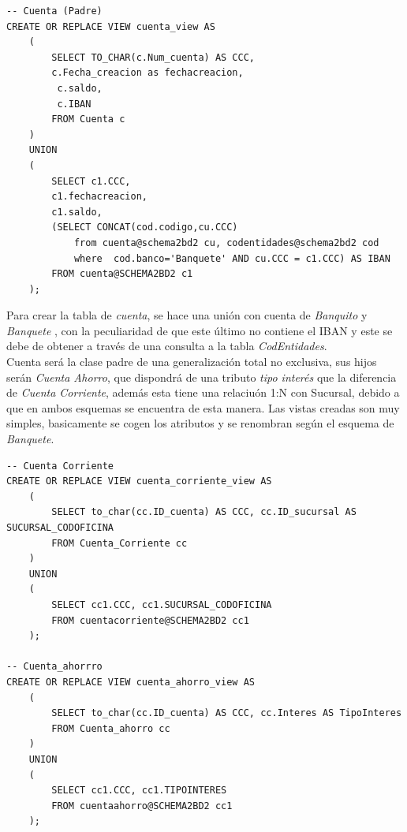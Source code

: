 \documentclass{article}
\begin{document}
\begin{lstlisting}
-- Cuenta (Padre)
CREATE OR REPLACE VIEW cuenta_view AS
    (
        SELECT TO_CHAR(c.Num_cuenta) AS CCC,
        c.Fecha_creacion as fechacreacion,
         c.saldo, 
         c.IBAN
        FROM Cuenta c
    )
    UNION
    (
        SELECT c1.CCC, 
        c1.fechacreacion, 
        c1.saldo, 
        (SELECT CONCAT(cod.codigo,cu.CCC) 
            from cuenta@schema2bd2 cu, codentidades@schema2bd2 cod
            where  cod.banco='Banquete' AND cu.CCC = c1.CCC) AS IBAN
        FROM cuenta@SCHEMA2BD2 c1
    );
\end{lstlisting}
Para crear la tabla de \textit{cuenta}, se hace una unión con cuenta de \emph{Banquito} y \emph{Banquete }, con la peculiaridad de que este último no contiene el IBAN y este se debe de obtener a través de una consulta a la tabla \textit{CodEntidades}.\\
Cuenta será la clase padre de una generalización total no exclusiva, sus hijos serán \textit{Cuenta Ahorro}, que dispondrá de una tributo \textit{tipo interés }que la diferencia de \textit{Cuenta Corriente}, además esta tiene una relaciuón 1:N con Sucursal, debido a que en ambos esquemas se encuentra de esta manera. Las vistas creadas son muy simples, basicamente se cogen los atributos y se renombran según el esquema de \emph{Banquete}.
\begin{lstlisting}
-- Cuenta Corriente
CREATE OR REPLACE VIEW cuenta_corriente_view AS
    (
        SELECT to_char(cc.ID_cuenta) AS CCC, cc.ID_sucursal AS SUCURSAL_CODOFICINA
        FROM Cuenta_Corriente cc
    )
    UNION
    (
        SELECT cc1.CCC, cc1.SUCURSAL_CODOFICINA
        FROM cuentacorriente@SCHEMA2BD2 cc1
    );

-- Cuenta_ahorrro
CREATE OR REPLACE VIEW cuenta_ahorro_view AS
    (
        SELECT to_char(cc.ID_cuenta) AS CCC, cc.Interes AS TipoInteres
        FROM Cuenta_ahorro cc
    )
    UNION
    (
        SELECT cc1.CCC, cc1.TIPOINTERES
        FROM cuentaahorro@SCHEMA2BD2 cc1
    );
\end{lstlisting}
\end{document}
